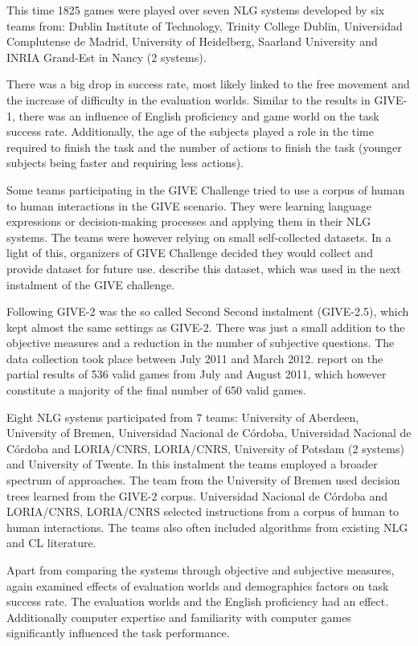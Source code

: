 This time 1825 games were played over seven NLG systems developed by six teams from: Dublin Institute of Technology, Trinity College Dublin, Universidad Complutense de Madrid, University of Heidelberg, Saarland University and INRIA Grand-Est in Nancy (2 systems).

There was a big drop in success rate, most likely linked to the free movement and the increase of difficulty in the evaluation worlds. Similar to the results in GIVE-1, there was an influence of English proficiency and game world on the task success rate. Additionally, the age of the subjects played a role in the time required to finish the task and the number of actions to finish the task (younger subjects being faster and requiring less actions).

Some teams participating in the GIVE Challenge tried to use a corpus of human to human interactions in the GIVE scenario. They were learning language expressions or decision-making processes and applying them in their NLG systems. The teams were however relying on small self-collected datasets. In a light of this, organizers of GIVE Challenge decided they would collect and provide dataset for future use. \citet{gargett2010give} describe this dataset, which was used in the next instalment of the GIVE challenge.

Following GIVE-2 was the so called Second Second instalment (GIVE-2.5), which kept almost the same settings as GIVE-2. There was just a small addition to the objective measures and a reduction in the number of subjective questions. The data collection took place between July 2011 and March 2012. \citet{striegnitz2011report} report on the partial results of 536 valid games from July and August 2011, which however constitute a majority of the final number of 650 valid games.

Eight NLG systems participated from 7 teams: University of Aberdeen, University of Bremen, Universidad Nacional de Córdoba, Universidad Nacional de Córdoba and LORIA/CNRS, LORIA/CNRS, University of Potsdam (2 systems) and University of Twente. In this instalment the teams employed a broader spectrum of approaches. The team from the University of Bremen used decision trees learned from the GIVE-2 corpus. Universidad Nacional de Córdoba and LORIA/CNRS, LORIA/CNRS selected instructions from a corpus of human to human interactions. The teams also often included algorithms from existing NLG and CL literature.

Apart from comparing the systems through objective and subjective measures, \citet{striegnitz2011report} again examined effects of evaluation worlds and demographics factors on task success rate. The evaluation worlds and the English proficiency had an effect. Additionally computer expertise and familiarity with computer games significantly influenced the task performance.

